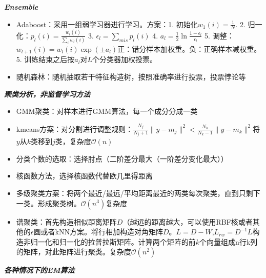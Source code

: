 \documentclass[UTF8,a4paper,landscape,compress]{paper}
\renewcommand{\section}[1]{{\normalsize\textbf{\emph{#1}}}\\ }
\newcommand{\List}[1]{\begin{itemize}[fullwidth,itemindent=0em] #1 \end{itemize}}
\begin{document}
\begin{multicols}{4}
\section{Ensemble}
\List{
    \item {Adaboost：采用一组弱学习器进行学习。方案：1. 初始化$w_1(i) = \frac1N$. 2. 归一化：$p_l(i) = \frac{w_l(i)}{\sum_i w_l(i)}$ 3. $\epsilon_l = \sum_{mis}p_l(i)$ 4. $a_l = \frac12\ln\frac{1-\epsilon_l}{\epsilon_l}$ 5. 调整：$w_{l+1}(i) = w_l(i)\exp(\pm a_l)$正：错分样本加权重。负：正确样本减权重。5. 训练结束之后按$a_l$对$L$个分类器加权投票。}
    \item {随机森林：随机抽取若干特征构造树，按照准确率进行投票，投票悖论等}
}
\section{聚类分析，非监督学习方法}
\List{
    \item {GMM聚类：对样本进行GMM算法，每一个成分分成一类}
    \item {kmeans方案：对分割进行调整规则：$\frac{N_j}{N_j + 1}\|y-m_j\|^2 < \frac{N_k}{N_k - 1}\|y-m_k\|^2$将$y$从$k$类移到$j$类，复杂度$\mathcal O(n)$}
    \item {分类个数的选取：选择肘点（二阶差分最大（一阶差分变化最大））}
    \item {核函数方法，选择核函数代替欧几里得距离}
    \item {多级聚类方案：将两个最近/最远/平均距离最近的两类每次聚类，直到只剩下一类。形成聚类树。$\mathcal O(n^3)$复杂度}
    \item {谱聚类：首先构造相似距离矩阵$D$（越远的距离越大，可以使用RBF核或者其他的$\epsilon$圆或者kNN方案。将行相加构造对角矩阵$D$。$L = D - W$,$L_{rw} = D^{-1}L$构造非归一化和归一化的拉普拉斯矩阵。计算两个矩阵的前$k$个向量组成n行k列的矩阵，对此矩阵进行聚类。复杂度$\mathcal O(n^2)$}
}
\clearpage
\section{各种情况下的EM算法}

\end{multicols}
\end{document}
